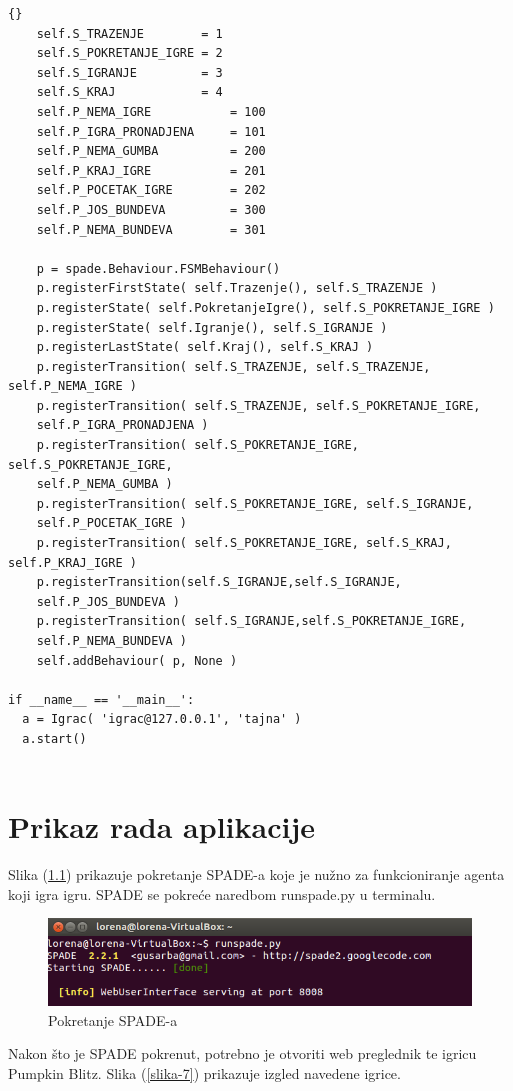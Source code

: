 \documentclass[a4paper,12pt]{foi}
\begin{document}
\begin{lstlisting}[frame=tb]{}
    self.S_TRAZENJE        = 1
    self.S_POKRETANJE_IGRE = 2
    self.S_IGRANJE         = 3
    self.S_KRAJ            = 4  
    self.P_NEMA_IGRE           = 100
    self.P_IGRA_PRONADJENA     = 101
    self.P_NEMA_GUMBA          = 200
    self.P_KRAJ_IGRE           = 201
    self.P_POCETAK_IGRE        = 202
    self.P_JOS_BUNDEVA         = 300
    self.P_NEMA_BUNDEVA        = 301
    
    p = spade.Behaviour.FSMBehaviour()
    p.registerFirstState( self.Trazenje(), self.S_TRAZENJE )
    p.registerState( self.PokretanjeIgre(), self.S_POKRETANJE_IGRE )
    p.registerState( self.Igranje(), self.S_IGRANJE )
    p.registerLastState( self.Kraj(), self.S_KRAJ ) 
    p.registerTransition( self.S_TRAZENJE, self.S_TRAZENJE, self.P_NEMA_IGRE )
    p.registerTransition( self.S_TRAZENJE, self.S_POKRETANJE_IGRE,
    self.P_IGRA_PRONADJENA )
    p.registerTransition( self.S_POKRETANJE_IGRE, self.S_POKRETANJE_IGRE,
    self.P_NEMA_GUMBA )
    p.registerTransition( self.S_POKRETANJE_IGRE, self.S_IGRANJE,
    self.P_POCETAK_IGRE )
    p.registerTransition( self.S_POKRETANJE_IGRE, self.S_KRAJ, self.P_KRAJ_IGRE ) 
    p.registerTransition(self.S_IGRANJE,self.S_IGRANJE,
    self.P_JOS_BUNDEVA )
    p.registerTransition( self.S_IGRANJE,self.S_POKRETANJE_IGRE,
    self.P_NEMA_BUNDEVA )
    self.addBehaviour( p, None )
    
if __name__ == '__main__':
  a = Igrac( 'igrac@127.0.0.1', 'tajna' )
  a.start()


\end{lstlisting}

\chapter{Prikaz rada aplikacije}
Slika (\ref{slika-6}) prikazuje pokretanje SPADE-a koje je nužno za funkcioniranje agenta koji igra igru. SPADE se pokreće naredbom runspade.py u terminalu.

\begin{figure}[h]
\centering 
\includegraphics[width=1\textwidth]{spade.png}
\caption{Pokretanje SPADE-a}
\label{slika-6}
\end{figure}

Nakon što je SPADE pokrenut, potrebno je otvoriti web preglednik te igricu Pumpkin Blitz. Slika (\ref{slika-7}) prikazuje izgled navedene igrice.
\end{document}
